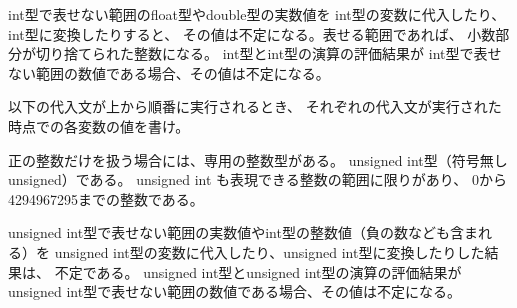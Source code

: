 \documentclass[12pt,a4j]{jarticle}
\newcounter{toi}
\def\toi{%
\bigskip\bigskip\noindent
\addtocounter{toi}{1}
\shadowbox{\bfseries\large 問\thetoi}
\nopagebreak[4]\bigskip\nopagebreak[4]
}
\begin{document}
int型で表せない範囲のfloat型やdouble型の実数値を
int型の変数に代入したり、int型に変換したりすると、
その値は不定になる。表せる範囲であれば、
小数部分が切り捨てられた整数になる。
int型とint型の演算の評価結果が
int型で表せない範囲の数値である場合、その値は不定になる。

以下の代入文が上から順番に実行されるとき、
それぞれの代入文が実行された時点での各変数の値を書け。


\begin{center}
\end{center}







\toi

正の整数だけを扱う場合には、専用の整数型がある。
unsigned int型（符号無し unsigned）である。
unsigned int も表現できる整数の範囲に限りがあり、
0から4294967295までの整数である。

unsigned int型で表せない範囲の実数値やint型の整数値（負の数なども含まれる）を
unsigned int型の変数に代入したり、unsigned int型に変換したりした結果は、
不定である。
unsigned int型とunsigned int型の演算の評価結果が
unsigned int型で表せない範囲の数値である場合、その値は不定になる。
\end{document}
